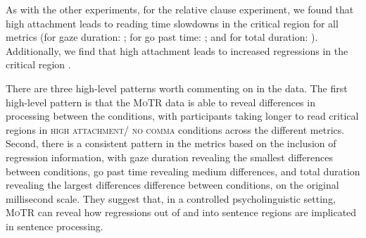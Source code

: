 \documentclass[12pt]{article}
\newcommand{\motr}{\textsc{MoTR}\xspace}
\newcommand{\nocomma}{\textsc{no comma}\xspace}
\newcommand{\highattach}{\textsc{high attachment}\xspace}
\begin{document}
{%

As with the other experiments, for the relative clause experiment, we found that high attachment leads to reading time slowdowns in the critical region for all metrics (for gaze duration: ; for go past time: ; and for total duration: ). Additionally, we find that high attachment leads to increased regressions in the critical region .

There are three high-level patterns worth commenting on in the data. The first high-level pattern is that the \motr data is able to reveal differences in processing between the conditions, with participants taking longer to read critical regions in \highattach / \nocomma conditions across the different metrics. Second, there is a consistent pattern in the metrics based on the inclusion of regression information, with gaze duration revealing the smallest differences between conditions, go past time revealing medium differences, and total duration revealing the largest differences difference between conditions, on the original millisecond scale. %
They suggest that, in a controlled psycholinguistic setting, \motr can reveal how regressions out of and into sentence regions are implicated in sentence processing.

}
\end{document}
